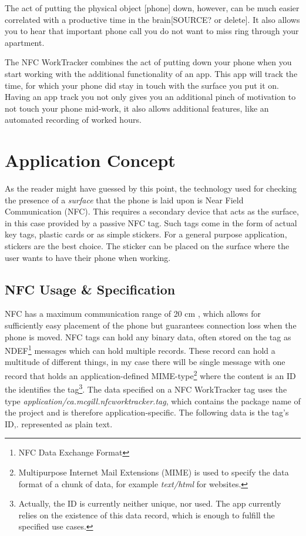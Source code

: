 \documentclass[conference]{IEEEtran}
\newcommand{\projectname}{NFC WorkTracker}
\begin{document}
The act of putting the physical object [phone] down, however, can be much easier correlated with a productive time in the brain[SOURCE? or delete]. It also allows you to hear that important phone call you do not want to miss ring through your apartment.

The {\projectname} combines the act of putting down your phone when you start working with the additional functionality of an app. This app will track the time, for which your phone did stay in touch with the surface you put it on. Having an app track you not only gives you an additional pinch of motivation to not touch your phone mid-work, it also allows additional features, like an automated recording of worked hours.

\section{Application Concept}
As the reader might have guessed by this point, the technology used for checking the presence of a \textit{surface} that the phone is laid upon is Near Field Communication (NFC). This requires a secondary device that acts as the surface, in this case provided by a passive NFC tag. Such tags come in the form of actual key tags, plastic cards or as simple stickers. For a general purpose application, stickers are the best choice. The sticker can be placed on the surface where the user wants to have their phone when working.

\subsection{NFC Usage \& Specification}
\label{sec:nfc-details}
NFC has a maximum communication range of 20 cm \cite{nfcsurvey}, which allows for sufficiently easy placement of the phone but guarantees connection loss when the phone is moved. NFC tags can hold any binary data, often stored on the tag as NDEF\footnote{NFC Data Exchange Format} messages which can hold multiple records. These record can hold a multitude of different things, in my case there will be single message with one record that holds an application-defined MIME-type\footnote{Multipurpose Internet Mail Extensions (MIME) is used to specify the data format of a chunk of data, for example \textit{text/html} for websites.} where the content is an ID the identifies the tag\footnote{Actually, the ID is currently neither unique, nor used. The app currently relies on the existence of this data record, which is enough to fulfill the specified use cases.}. The data specified on a \projectname{} tag uses the type \textit{application/ca.mcgill.nfcworktracker.tag}, which contains the package name of the project and is therefore application-specific. The following data is the tag's ID,. represented as plain text.
\end{document}
